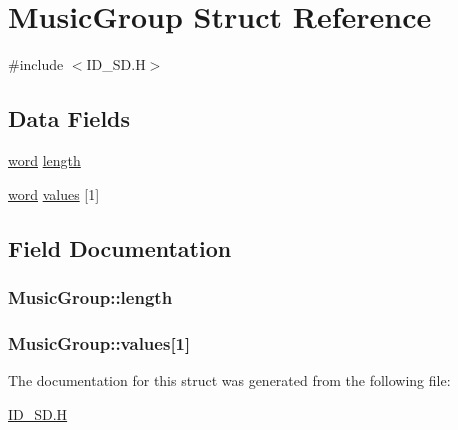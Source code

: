 \hypertarget{structMusicGroup}{
\section{MusicGroup Struct Reference}
\label{structMusicGroup}
}


{\ttfamily \#include $<$ID\_\-SD.H$>$}

\subsection*{Data Fields}
\begin{DoxyCompactItemize}
\item 
\hyperlink{ID__HEAD_8H_abad51e07ab6d26bec9f1f786c8d65bcd}{word} \hyperlink{structMusicGroup_a6601deffff48f366a72f498ab13f86f4}{length}
\item 
\hyperlink{ID__HEAD_8H_abad51e07ab6d26bec9f1f786c8d65bcd}{word} \hyperlink{structMusicGroup_afaafe6e3ba7513e037dd32aae258468c}{values} \mbox{[}1\mbox{]}
\end{DoxyCompactItemize}


\subsection{Field Documentation}
\hypertarget{structMusicGroup_a6601deffff48f366a72f498ab13f86f4}{
\subsubsection[{length}]{ {\bf MusicGroup::length}}}
\label{structMusicGroup_a6601deffff48f366a72f498ab13f86f4}
\hypertarget{structMusicGroup_afaafe6e3ba7513e037dd32aae258468c}{
\subsubsection[{values}]{ {\bf MusicGroup::values}\mbox{[}1\mbox{]}}}
\label{structMusicGroup_afaafe6e3ba7513e037dd32aae258468c}


The documentation for this struct was generated from the following file:\begin{DoxyCompactItemize}
\item 
\hyperlink{ID__SD_8H}{ID\_\-SD.H}\end{DoxyCompactItemize}
